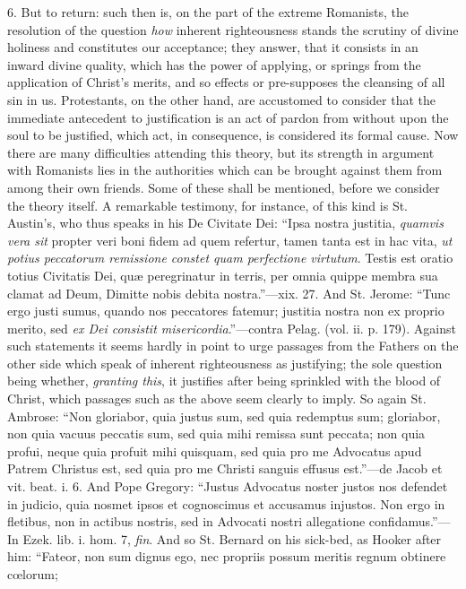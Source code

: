 6. But to return: such then is, on the part of the extreme
Romanists, the resolution of the question \emph{how} inherent
righteousness stands the scrutiny of divine holiness and constitutes
our acceptance; they answer, that it consists in an inward divine
quality, which has the power of applying, or springs from the
application of Christ's merits, and so effects or pre-supposes the
cleansing of all sin in us. Protestants, on the other hand, are
accustomed to consider that the immediate antecedent to justification
is an act of pardon from without upon the soul to be justified, which
act, in consequence, is considered its formal cause. Now there are
many difficulties attending this theory, but its strength in argument
with Romanists lies in the authorities which can be brought against
them from among their own friends. Some of these shall be mentioned,
before we consider the theory itself. A remarkable testimony, for
instance, of this kind is St. Austin's, who thus speaks in his De
Civitate Dei: ``Ipsa nostra justitia, \emph{quamvis vera sit}
propter veri boni fidem ad quem refertur, tamen tanta est in hac vita,
\emph{ut potius peccatorum remissione constet quam perfectione virtutum}.
Testis est oratio totius Civitatis Dei, quæ peregrinatur in terris,
per omnia quippe membra sua clamat ad Deum, Dimitte nobis debita
nostra.''—xix. 27. And St. Jerome: ``Tunc ergo justi sumus,
quando nos peccatores fatemur; justitia nostra non ex proprio merito,
sed \emph{ex Dei consistit misericordia}.''—contra Pelag. (vol.
ii. p. 179). Against such statements it seems hardly in point to urge
passages from the Fathers on the other side which speak of inherent
righteousness as justifying; the sole question being whether, \emph{granting
this}, it justifies after being sprinkled with the blood of Christ, which passages such as the above seem
clearly to imply. So again St. Ambrose: ``Non gloriabor, quia
justus sum, sed quia redemptus sum; gloriabor, non quia vacuus
peccatis sum, sed quia mihi remissa sunt peccata; non quia profui,
neque quia profuit mihi quisquam, sed quia pro me Advocatus apud
Patrem Christus est, sed quia pro me Christi sanguis effusus
est.''—de Jacob et vit. beat. i. 6. And Pope Gregory:
``Justus Advocatus noster justos nos defendet in judicio, quia
nosmet ipsos et cognoscimus et accusamus injustos. Non ergo in
fletibus, non in actibus nostris, sed in Advocati nostri allegatione
confidamus.''—In Ezek. lib. i. hom. 7, \emph{fin}. And so St.
Bernard on his sick-bed, as Hooker after him: ``Fateor, non sum
dignus ego, nec propriis possum meritis regnum obtinere cœlorum;
